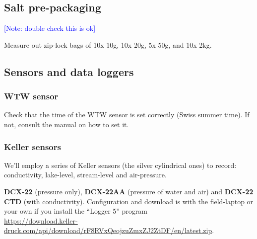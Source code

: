 \documentclass[DIV=15,halfparskip,11pt,headinclude]{scrartcl}
\newcommand{\note}[1]{\textcolor{blue}{[Note: #1]}}
\newcommand{\note}[1]{}
\begin{document}
\subsection{Salt pre-packaging}
\note{double check this is ok}

Measure out zip-lock bags of 10x 10g, 10x 20g, 5x 50g, and 10x 2kg.

\subsection{Sensors and data loggers}
\subsubsection{WTW sensor}

Check that the time of the WTW sensor is set correctly (Swiss summer
time).  If not, consult the manual on how to set it.

\subsubsection{Keller sensors}
\label{s:press-trans}

We'll employ a series of Keller sensors (the silver cylindrical ones)
to record: conductivity, lake-level, stream-level and air-pressure.

\textbf{DCX-22} (pressure only), \textbf{DCX-22AA} (pressure of water
and air) and \textbf{DCX-22 CTD} (with conductivity).  Configuration
and download is with the field-laptop or your own if you install
the ``Logger 5''
program\\
\url{https://download.keller-druck.com/api/download/rF8RVxQeojzuZmxZJ2ZtDF/en/latest.zip}.
\end{document}
